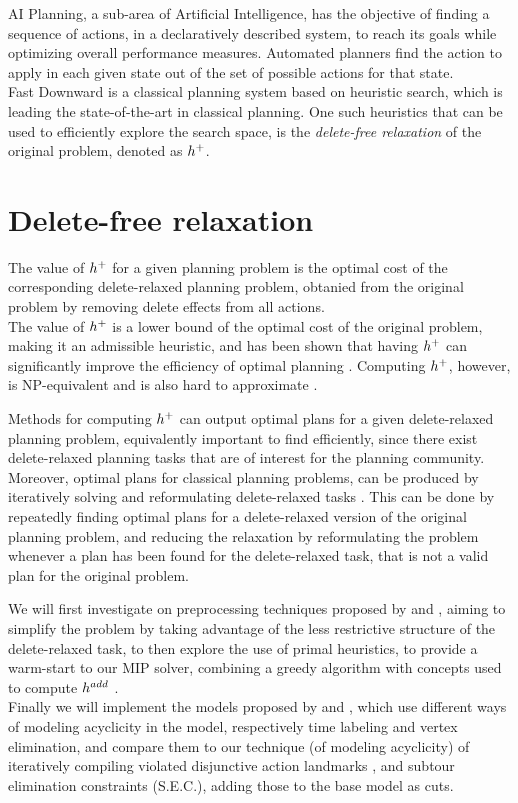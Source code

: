 AI Planning, a sub-area of Artificial Intelligence, has the objective of finding a sequence of actions, in a declaratively described system, to reach its goals while optimizing overall performance measures. Automated planners find the action to apply in each given state out of the set of possible actions for that state.\\
Fast Downward \cite{Helmert_06} is a classical planning system based on heuristic search, which is leading the state-of-the-art in classical planning. One such heuristics that can be used to efficiently explore the search space, is the \textit{delete-free relaxation} of the original problem, denoted as $h^+$.

\section{Delete-free relaxation}
The value of $h^+$ for a given planning problem is the optimal cost of the corresponding delete-relaxed planning problem, obtanied from the original problem by removing delete effects from all actions.\\
The value of $h^+$ is a lower bound of the optimal cost of the original problem, making it an admissible heuristic, and has been shown that having $h^+$ can significantly improve the efficiency of optimal planning \cite{Helmert_09}. Computing $h^+$, however, is NP-equivalent \cite{Bylander_94} and is also hard to approximate \cite{Helmert_09}.

Methods for computing $h^+$ can output optimal plans for a given delete-relaxed planning problem, equivalently important to find efficiently, since there exist delete-relaxed planning tasks that are of interest for the planning community. Moreover, optimal plans for classical planning problems, can be produced by iteratively solving and reformulating delete-relaxed tasks \cite{LB_Haslum_12}. This can be done by repeatedly finding optimal plans for a delete-relaxed version of the original planning problem, and reducing the relaxation by reformulating the problem whenever a plan has been found for the delete-relaxed task, that is not a valid plan for the original problem.

We will first investigate on preprocessing techniques proposed by \cite{Imai_15} and \cite{MLM_Haslum_12}, aiming to simplify the problem by taking advantage of the less restrictive structure of the delete-relaxed task, to then explore the use of primal heuristics, to provide a warm-start to our MIP solver, combining a greedy algorithm with concepts used to compute $h^{add}$ \cite{Bonet_01}.\\
Finally we will implement the models proposed by \cite{Imai_15} and \cite{Rankooh_22}, which use different ways of modeling acyclicity in the model, respectively time labeling and vertex elimination, and compare them to our technique (of modeling acyclicity) of iteratively compiling violated disjunctive action landmarks \cite{MLM_Haslum_12}, \cite{Bonet_11} and subtour elimination constraints (S.E.C.), adding those to the base model as cuts.

